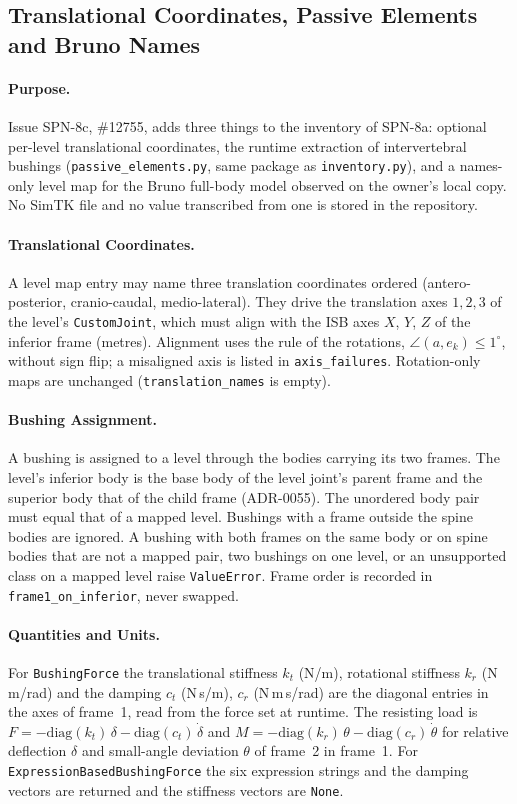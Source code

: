 \subsection{Translational Coordinates, Passive Elements and Bruno Names}

\paragraph{Purpose.} Issue SPN-8c, \#12755, adds three things to the inventory
of SPN-8a: optional per-level translational coordinates, the runtime
extraction of intervertebral bushings (\texttt{passive\_elements.py}, same
package as \texttt{inventory.py}), and a names-only level map for the Bruno
full-body model observed on the owner's local copy. No SimTK file and no value
transcribed from one is stored in the repository.

\paragraph{Translational Coordinates.} A level map entry may name three
translation coordinates ordered (antero-posterior, cranio-caudal,
medio-lateral). They drive the translation axes $1,2,3$ of the level's
\texttt{CustomJoint}, which must align with the ISB axes $X$, $Y$, $Z$ of the
inferior frame (metres). Alignment uses the rule of the rotations,
$\angle(a, e_k)\le 1^\circ$, without sign flip; a misaligned axis is listed in
\texttt{axis\_failures}. Rotation-only maps are unchanged
(\texttt{translation\_names} is empty).

\paragraph{Bushing Assignment.} A bushing is assigned to a level through the
bodies carrying its two frames. The level's inferior body is the base body of
the level joint's parent frame and the superior body that of the child frame
(ADR-0055). The unordered body pair must equal that of a mapped level.
Bushings with a frame outside the spine bodies are ignored. A bushing with
both frames on the same body or on spine bodies that are not a mapped pair,
two bushings on one level, or an unsupported class on a mapped level raise
\texttt{ValueError}. Frame order is recorded in \texttt{frame1\_on\_inferior},
never swapped.

\paragraph{Quantities and Units.} For \texttt{BushingForce} the translational
stiffness $k_t$ (N/m), rotational stiffness $k_r$ (N\,m/rad) and the damping
$c_t$ (N\,s/m), $c_r$ (N\,m\,s/rad) are the diagonal entries in the axes of
frame~1, read from the force set at runtime. The resisting load is
$F=-\mathrm{diag}(k_t)\,\delta-\mathrm{diag}(c_t)\,\dot\delta$ and
$M=-\mathrm{diag}(k_r)\,\theta-\mathrm{diag}(c_r)\,\dot\theta$ for relative
deflection $\delta$ and small-angle deviation $\theta$ of frame~2 in frame~1.
For \texttt{ExpressionBasedBushingForce} the six expression strings and the
damping vectors are returned and the stiffness vectors are \texttt{None}.

